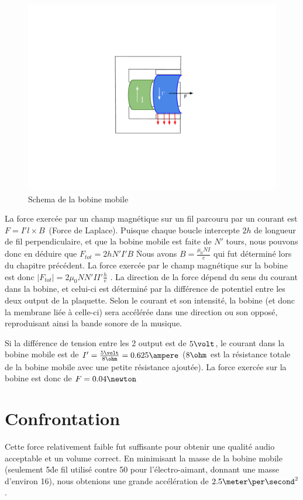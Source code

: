 \begin{figure}	
\begin{center}
\includegraphics[scale=0.5]{img/bobine-mobile}
\end{center}
\caption{Schema de la bobine mobile}		
\label{fig:bobinemobile}		
\end{figure}

La force exercée par un champ magnétique sur un fil parcouru par un courant est $F =  I' l \times B$\, (Force de Laplace). Puisque 
chaque boucle intercepte $2h$ de longueur de fil perpendiculaire, et que la bobine mobile est faite de $N'$ tours, nous pouvons
donc en déduire que $F_{tot} = 2 h N' I' B$ \. Nous avons $B = \frac{\mu_0 N I}{e}$ qui fut déterminé 
lors du chapitre précédent. La force exercée par le champ magnétique sur la bobine est donc 
$ |F_{tot}| = 2 \mu_0 N N' I I' \frac{h}{e}$ . La direction de la force dépend du sens du courant dans la bobine, et 
celui-ci est déterminé par la différence de potentiel entre les deux output de la plaquette. Selon le courant et son
intensité, la bobine (et donc la membrane liée à celle-ci) sera accélérée dans une direction ou son opposé, reproduisant 
ainsi la bande sonore de la musique.

Si la différence de tension entre les 2 output est de $5\volt$, le courant dans la bobine mobile est de 
$I' = \frac{5\volt}{8\ohm} = 0.625\ampere$ ($8\ohm$ est la résistance totale de la bobine mobile avec une petite 
résistance ajoutée). La force exercée sur la bobine est donc de $F = 0.04 \newton$
\section{Confrontation}
Cette force relativement faible fut suffisante pour obtenir une qualité audio acceptable et un volume correct. 
En minimisant la masse de la bobine mobile (seulement 5\meter \. de fil utilisé contre 50 pour l'électro-aimant, 
donnant une masse d'environ 16\gram), nous obtenions une grande accélération de $2.5\meter\per\second^2$. 
